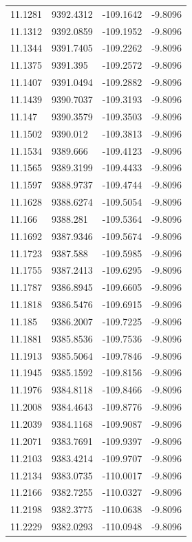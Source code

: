 \begin{table}[H]
\begin{tabular}{llll}
11.1281 & 9392.4312 & -109.1642 & -9.8096 \\
11.1312 & 9392.0859 & -109.1952 & -9.8096 \\
11.1344 & 9391.7405 & -109.2262 & -9.8096 \\
11.1375 & 9391.395 & -109.2572 & -9.8096 \\
11.1407 & 9391.0494 & -109.2882 & -9.8096 \\
11.1439 & 9390.7037 & -109.3193 & -9.8096 \\
11.147 & 9390.3579 & -109.3503 & -9.8096 \\
11.1502 & 9390.012 & -109.3813 & -9.8096 \\
11.1534 & 9389.666 & -109.4123 & -9.8096 \\
11.1565 & 9389.3199 & -109.4433 & -9.8096 \\
11.1597 & 9388.9737 & -109.4744 & -9.8096 \\
11.1628 & 9388.6274 & -109.5054 & -9.8096 \\
11.166 & 9388.281 & -109.5364 & -9.8096 \\
11.1692 & 9387.9346 & -109.5674 & -9.8096 \\
11.1723 & 9387.588 & -109.5985 & -9.8096 \\
11.1755 & 9387.2413 & -109.6295 & -9.8096 \\
11.1787 & 9386.8945 & -109.6605 & -9.8096 \\
11.1818 & 9386.5476 & -109.6915 & -9.8096 \\
11.185 & 9386.2007 & -109.7225 & -9.8096 \\
11.1881 & 9385.8536 & -109.7536 & -9.8096 \\
11.1913 & 9385.5064 & -109.7846 & -9.8096 \\
11.1945 & 9385.1592 & -109.8156 & -9.8096 \\
11.1976 & 9384.8118 & -109.8466 & -9.8096 \\
11.2008 & 9384.4643 & -109.8776 & -9.8096 \\
11.2039 & 9384.1168 & -109.9087 & -9.8096 \\
11.2071 & 9383.7691 & -109.9397 & -9.8096 \\
11.2103 & 9383.4214 & -109.9707 & -9.8096 \\
11.2134 & 9383.0735 & -110.0017 & -9.8096 \\
11.2166 & 9382.7255 & -110.0327 & -9.8096 \\
11.2198 & 9382.3775 & -110.0638 & -9.8096 \\
11.2229 & 9382.0293 & -110.0948 & -9.8096 \\

\end{tabular}
\end{table}
